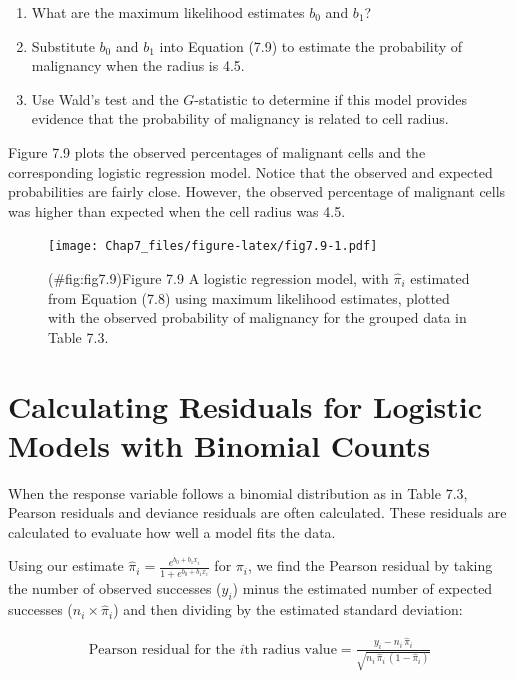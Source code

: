 \documentclass[
]{report}
\providecommand{\tightlist}{%
  \setlength{\itemsep}{0pt}\setlength{\parskip}{0pt}}
\begin{document}
\begin{enumerate}
\def\labelenumi{\alph{enumi}.}
\tightlist
\item
  What are the maximum likelihood estimates \(b_0\) and \(b_1\)?\\
\item
  Substitute \(b_0\) and \(b_1\) into Equation (7.9) to estimate the probability of malignancy when the radius is 4.5.\\
\item
  Use Wald's test and the \(G\)-statistic to determine if this model provides evidence that the probability of malignancy is related to cell radius.
\end{enumerate}

Figure 7.9 plots the observed percentages of malignant cells and the corresponding logistic regression model.
Notice that the observed and expected probabilities are fairly close. However, the observed percentage of
malignant cells was higher than expected when the cell radius was 4.5.

\begin{figure}
\centering
\texttt{[image: Chap7\_files/figure-latex/fig7.9-1.pdf]}
\caption{(\#fig:fig7.9)Figure 7.9 A logistic regression model, with \(\hat \pi_i\) estimated from Equation (7.8) using maximum likelihood estimates, plotted with the observed probability of malignancy for the grouped data in Table 7.3.}
\end{figure}

\section{Calculating Residuals for Logistic Models with Binomial Counts}\label{calculating-residuals-for-logistic-models-with-binomial-counts}

When the response variable follows a binomial distribution as in Table 7.3, Pearson residuals and
deviance residuals are often calculated. These residuals are calculated to evaluate how well a model
fits the data.

Using our estimate \(\hat\pi_i = \frac{e^{b_0 + b_1 x_i}}{1 + e^{b_0 + b_1 x_i}}\) for \(\pi_i\), we find the Pearson residual by taking the number of observed successes (\(y_i\)) minus the estimated number of expected successes (\(n_i \times \hat\pi_i\)) and then dividing by the estimated standard deviation:

\begin{align}
\text{Pearson residual for the $i$th radius value}
= \frac{y_i - n_i \,\hat\pi_i}{\sqrt{n_i \,\hat\pi_i\,(1 - \hat\pi_i)}}
\tag{7.23}
\end{align}
\end{document}
